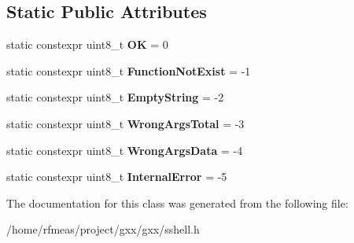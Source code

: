 \subsection*{Static Public Attributes}
\begin{DoxyCompactItemize}
\item 
static constexpr uint8\+\_\+t {\bfseries OK} = 0\hypertarget{classgxx_1_1sshell_a7d09f9240f4fff61bc3082ee04a82987}{}\label{classgxx_1_1sshell_a7d09f9240f4fff61bc3082ee04a82987}

\item 
static constexpr uint8\+\_\+t {\bfseries Function\+Not\+Exist} = -\/1\hypertarget{classgxx_1_1sshell_a7d2628ce2db30dbbf5441bfc10b7c106}{}\label{classgxx_1_1sshell_a7d2628ce2db30dbbf5441bfc10b7c106}

\item 
static constexpr uint8\+\_\+t {\bfseries Empty\+String} = -\/2\hypertarget{classgxx_1_1sshell_a4350ee05da98d5d5b0728c79f4254c4d}{}\label{classgxx_1_1sshell_a4350ee05da98d5d5b0728c79f4254c4d}

\item 
static constexpr uint8\+\_\+t {\bfseries Wrong\+Args\+Total} = -\/3\hypertarget{classgxx_1_1sshell_a5bfefbfd61d4c6ff0cffc7a883063f3f}{}\label{classgxx_1_1sshell_a5bfefbfd61d4c6ff0cffc7a883063f3f}

\item 
static constexpr uint8\+\_\+t {\bfseries Wrong\+Args\+Data} = -\/4\hypertarget{classgxx_1_1sshell_a0ef47169ad804ed466334ed3abe0b37f}{}\label{classgxx_1_1sshell_a0ef47169ad804ed466334ed3abe0b37f}

\item 
static constexpr uint8\+\_\+t {\bfseries Internal\+Error} = -\/5\hypertarget{classgxx_1_1sshell_a6aa9a41bb0182a3bf619ece70b3fddc5}{}\label{classgxx_1_1sshell_a6aa9a41bb0182a3bf619ece70b3fddc5}

\end{DoxyCompactItemize}


The documentation for this class was generated from the following file\+:\begin{DoxyCompactItemize}
\item 
/home/rfmeas/project/gxx/gxx/sshell.\+h\end{DoxyCompactItemize}
